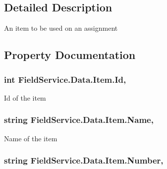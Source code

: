 \subsection{Detailed Description}
An item to be used on an assignment 



\subsection{Property Documentation}
\hypertarget{class_field_service_1_1_data_1_1_item_a699fbf045073eef6b09e49134de98376}{
\subsubsection[{Id}]{\setlength{\rightskip}{0pt plus 5cm}int Field\+Service.\+Data.\+Item.\+Id\hspace{0.3cm}{\ttfamily [get]}, {\ttfamily [set]}}}\label{class_field_service_1_1_data_1_1_item_a699fbf045073eef6b09e49134de98376}


Id of the item 

\hypertarget{class_field_service_1_1_data_1_1_item_ac5a4663cda3b160a05d4d668b217fa9c}{
\subsubsection[{Name}]{\setlength{\rightskip}{0pt plus 5cm}string Field\+Service.\+Data.\+Item.\+Name\hspace{0.3cm}{\ttfamily [get]}, {\ttfamily [set]}}}\label{class_field_service_1_1_data_1_1_item_ac5a4663cda3b160a05d4d668b217fa9c}


Name of the item 

\hypertarget{class_field_service_1_1_data_1_1_item_a4a33c93b28a729bced424fe39d0e1152}{
\subsubsection[{Number}]{\setlength{\rightskip}{0pt plus 5cm}string Field\+Service.\+Data.\+Item.\+Number\hspace{0.3cm}{\ttfamily [get]}, {\ttfamily [set]}}}\label{class_field_service_1_1_data_1_1_item_a4a33c93b28a729bced424fe39d0e1152}


